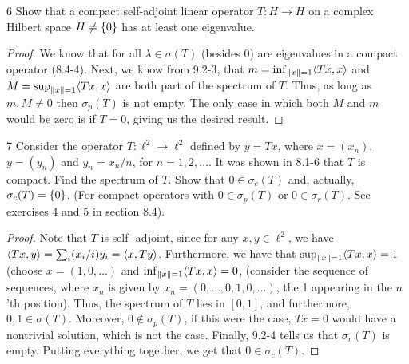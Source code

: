 \begin{exercise}{6}
Show that a compact self-adjoint linear operator $T: H \to H$ on a complex Hilbert space $H \neq \{0\}$ has at least one eigenvalue.
\end{exercise}
\begin{proof}
We know that for all $\lambda \in \sigma(T)$ (besides 0) are eigenvalues in a compact operator (8.4-4).
Next, we know from 9.2-3, that $m = \inf_{\left\lVert x\right\rVert = 1} \langle Tx, x\rangle$ and $M = \sup_{\left\lVert x\right\rVert = 1} \langle Tx, x\rangle$ are both part of the spectrum of $T$.
Thus, as long as $m, M \neq 0$ then $\sigma_p(T)$ is not empty.
The only case in which both $M$ and $m$ would be zero is if $T = 0$, giving us the desired result.
\end{proof} 

\begin{exercise}{7}
Consider the operator $T: \ell^2 \to \ell^2$ defined by $y = T x$, where $x = (x_n)$, $y = (y_n)$ and $y_n = x_n/n$, for $n = 1, 2, \dots$.
It was shown in 8.1-6 that $T$ is compact.
Find the spectrum of $T$.
Show that $0 \in \sigma_c(T)$ and, actually, $\sigma_c(T) = \{0\}$.
(For compact operators with $0 \in \sigma_p(T)$ or $0 \in \sigma_r(T)$.
See exercises 4 and 5 in section 8.4).
\end{exercise}
\begin{proof}
Note that $T$ is self- adjoint, since for any $x, y \in \ell^2$, we have $\langle Tx, y\rangle = \sum_i (x_i / i) \bar{y_i} = \langle x, Ty\rangle$.
Furthermore, we have that $\sup_{\left\lVert x\right\rVert = 1} \langle Tx, x\rangle = 1$ (choose $x = (1, 0, \dots)$ and $\inf_{\left\lVert x\right\rVert = 1} \langle Tx, x\rangle = 0$, (consider the sequence of sequences, where $x_n$ is given by $x_n = (0, \dots, 0, 1, 0, \dots)$, the 1 appearing in the $n$'th position).
Thus, the spectrum of $T$ lies in $[0, 1]$, and furthermore, $0, 1 \in \sigma(T)$.
Moreover, $0 \notin \sigma_p(T)$, if this were the case, $Tx = 0$ would have a nontrivial solution, which is not the case.
Finally, 9.2-4 tells us that $\sigma_r(T)$ is empty.
Putting everything together, we get that $0 \in \sigma_c(T)$.
\end{proof} 

